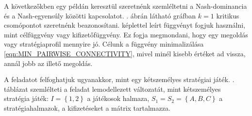 \begin{pld}
  A következőkben egy példán keresztül szeretnénk szemléltetni a Nash-dominancia és a Nash-egyensúly közötti kapcsolatot.
  . ábrán látható gráfban $k = 1$ kritikus csomópontot szeretnénk beazonosítani.
   képlettel leírt függvényt fogjuk használni, mint célfüggvény vagy kifizetőfüggvény.
  Ez fogja megmondani, hogy egy megoldás vagy stratégiaprofil mennyire jó.
  Célunk a függvény minimalizálása \ref{eqn:MIN_PAIRWISE_CONNECTIVITY}, mivel minél kisebb értéket ad vissza, annál jobb az illető megoldás.

  A feladatot felfoghatjuk ugyanakkor, mint egy kétszemélyes stratégiai játék.
  . táblázat szemlélteti a feladat lemodellezett változatát, mint kétszemélyes stratégia játék:
  $I = \left\{ 1, 2 \right\}$ a játékosok halmaza, $S_1 = S_2 = \left\{ A, B, C \right\}$ a stratégiahalmazok, a kifizetéseket a mátrix tartalmazza.


\end{pld}
